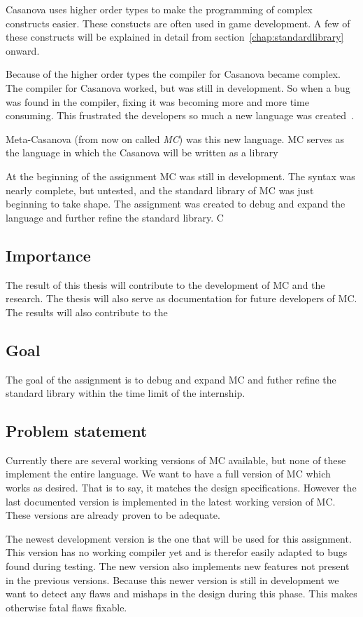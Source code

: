 Casanova uses higher order types to make the programming of complex constructs easier.
These constucts are often used in game development.
A few of these constructs will be explained in detail from section~\ref{chap:standardlibrary} onward.

Because of the higher order types the compiler for Casanova became complex.
The compiler for Casanova worked, but was still in development.
So when a bug was found in the compiler, fixing it was becoming more and more time consuming.
This frustrated the developers so much a new language was created~\cite{giuseppe2015mc}.

Meta-Casanova (from now on called \emph{MC}) was this new language.
MC serves as the language in which the Casanova will be written as a library

At the beginning of the assignment MC was still in development.
The syntax was nearly complete, but untested, and the standard library of MC was just beginning to take shape.
The assignment was created to debug and expand the language and further refine the standard library.
C

\subsection{Importance}
The result of this thesis will contribute to the development of MC and the research.
The thesis will also serve as documentation for future developers of MC.
The results will also contribute to the

\subsection{Goal}\label{sec:goalsmandate}
The goal of the assignment is to debug and expand MC and futher refine the standard library within the time limit of the internship.

\subsection{Problem statement}
Currently there are several working versions of MC available, but none of these implement the entire language.
We want to have a full version of MC which works as desired.
That is to say, it matches the design specifications.
However the last documented version is implemented in the latest working version of MC.
These versions are already proven to be adequate\cite{giuseppe2015mc}.

The newest development version is the one that will be used for this assignment.
This version has no working compiler yet and is therefor easily adapted to bugs found during testing.
The new version also implements new features not present in the previous versions.
Because this newer version is still in development we want to detect any flaws and mishaps in the design during this phase.
This makes otherwise fatal flaws fixable.


